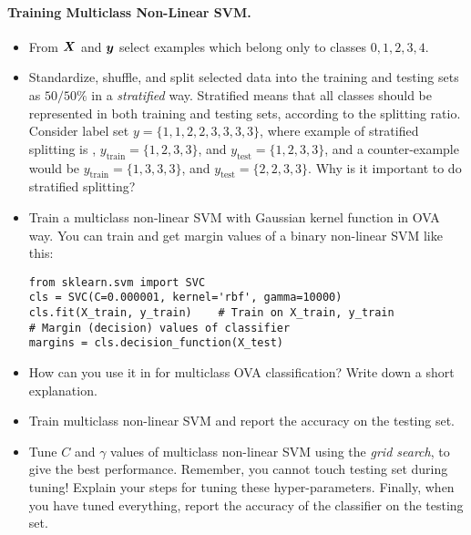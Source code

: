 \documentclass{article}
\begin{document}
\paragraph{Training Multiclass Non-Linear \ac{SVM}.}
\begin{itemize}
\item From $\boldsymbol{X}$ and $\boldsymbol{y}$ select examples which belong only to classes $0,1,2,3,4$.
\item Standardize, shuffle, and split selected data into the training and testing sets as $50/50\%$ in a \emph{stratified} way.
Stratified means that all classes should be represented in both training and testing sets, according to the splitting ratio.
Consider label set $y = \{1,1,2,2,3,3,3,3\}$, where example of stratified splitting is , $y_{\text{train}} = \{1, 2, 3, 3\}$, and $y_{\text{test}} = \{1, 2, 3, 3\}$,
and a counter-example would be $y_{\text{train}} = \{1, 3, 3, 3\}$, and $y_{\text{test}} = \{2, 2, 3, 3\}$.
Why is it important to do stratified splitting?
\item Train a multiclass non-linear \ac{SVM} with Gaussian kernel function in \ac{OVA} way. You can train and get margin values of a binary non-linear \ac{SVM} like this:
\begin{lstlisting}
from sklearn.svm import SVC
cls = SVC(C=0.000001, kernel='rbf', gamma=10000)
cls.fit(X_train, y_train)    # Train on X_train, y_train
# Margin (decision) values of classifier
margins = cls.decision_function(X_test)    
\end{lstlisting}
\item How can you use it in for multiclass \ac{OVA} classification? Write down a short explanation.
\item Train multiclass non-linear \ac{SVM} and report the accuracy on the testing set.
\item Tune $C$ and $\gamma$ values of multiclass non-linear \ac{SVM} using the \emph{grid search}, to give the best performance. Remember, you cannot touch testing set during tuning!
Explain your steps for tuning these hyper-parameters.
Finally, when you have tuned everything, report the accuracy of the classifier on the testing set.
\end{itemize}



\end{document}
